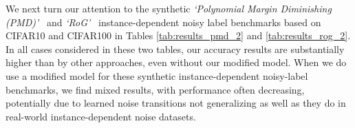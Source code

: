 \documentclass[10pt,twocolumn,letterpaper]{article}
\begin{document}
We next turn our attention to the synthetic \textit{`Polynomial Margin Diminishing (PMD)'}~\cite{zhang2020learning} and \textit{`RoG'}~\cite{lee2019robust} instance-dependent noisy label benchmarks based on CIFAR10 and CIFAR100 in Tables \ref{tab:results_pmd_2} and \ref{tab:results_rog_2}. In all cases considered in these two tables, our accuracy results are substantially higher than by other approaches, even without our modified model. When we do use a modified model for these synthetic instance-dependent noisy-label benchmarks, we find mixed results, with performance often decreasing, potentially due to learned noise transitions not generalizing as well as they do in real-world instance-dependent noise datasets.

\begin{table}[ht!]
    \begin{center}
    \end{center}
    \caption{Test accuracy (\%) for Polynomial Margin Diminishing Noise \cite{zhang2020learning}. Top methods are in \textbf{bold}.} 
    \label{tab:results_pmd_2}
\end{table}
\end{document}
